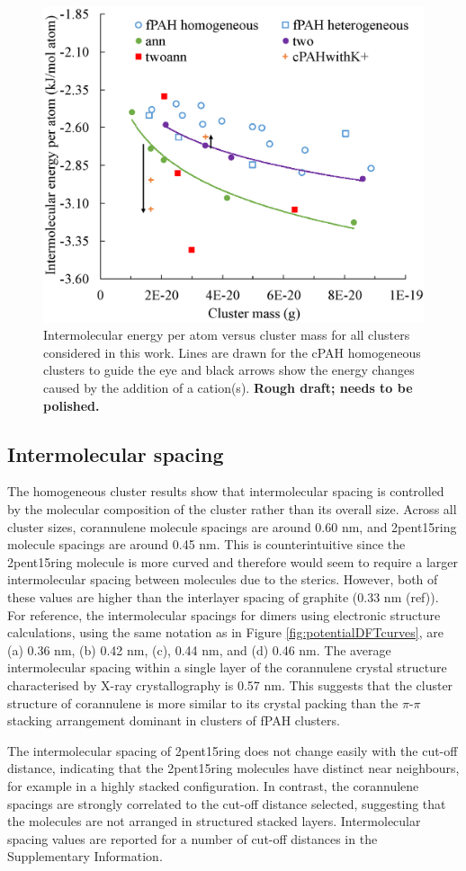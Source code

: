%
\begin{figure}[!tbh]
\centering
\includegraphics[width=0.5\linewidth]{Figures/energies.eps}
\caption{Intermolecular energy per atom versus cluster mass for all clusters considered in this work. Lines are drawn for the cPAH homogeneous clusters to guide the eye and black arrows show the energy changes caused by the addition of a cation(s). \textbf{Rough draft; needs to be polished.}}
\label{fig:energies}
\end{figure}
%
\subsection{Intermolecular spacing}

The homogeneous cluster results show that intermolecular spacing is controlled by the molecular composition of the cluster rather than its overall size.  Across all cluster sizes, corannulene molecule spacings are around 0.60 nm, and 2pent15ring molecule spacings are around 0.45 nm.  This is counterintuitive since the 2pent15ring molecule is more curved and therefore would seem to require a larger intermolecular spacing between molecules due to the sterics.  However, both of these values are higher than the interlayer spacing of graphite (0.33 nm (ref)). For reference, the intermolecular spacings for dimers using electronic structure calculations, using the same notation as in Figure \ref{fig:potentialDFTcurves}, are (a) 0.36 nm, (b) 0.42 nm, (c), 0.44 nm, and (d) 0.46 nm. The average intermolecular spacing within a single layer of the corannulene crystal structure characterised by X-ray crystallography is 0.57 nm. This suggests that the cluster structure of corannulene is more similar to its crystal packing than the $\pi$-$\pi$ stacking arrangement dominant in clusters of fPAH clusters.

The intermolecular spacing of 2pent15ring does not change easily with the cut-off distance, indicating that the 2pent15ring molecules have distinct near neighbours, for example in a highly stacked configuration. In contrast, the corannulene spacings are strongly correlated to the cut-off distance selected, suggesting that the molecules are not arranged in structured stacked layers. Intermolecular spacing values are reported for a number of cut-off distances in the Supplementary Information.

